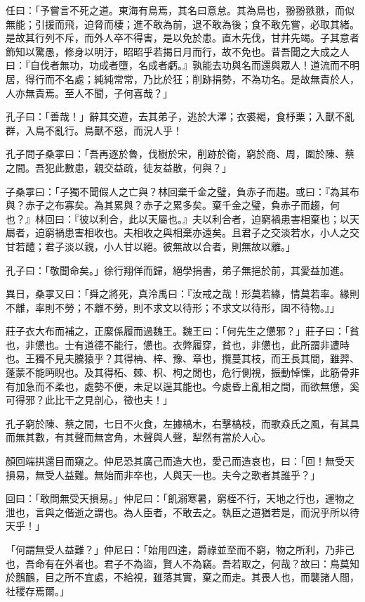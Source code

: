 \begin{pinyinscope}
任曰：「予嘗言不死之道。東海有鳥焉，其名曰意怠。其為鳥也，翂翂翐翐，而似無能；引援而飛，迫脅而棲；進不敢為前，退不敢為後；食不敢先嘗，必取其緒。是故其行列不斥，而外人卒不得害，是以免於患。直木先伐，甘井先竭。子其意者飾知以驚愚，修身以明汙，昭昭乎若揭日月而行，故不免也。昔吾聞之大成之人曰：『自伐者無功，功成者墮，名成者虧。』孰能去功與名而還與眾人！道流而不明居，得行而不名處；純純常常，乃比於狂；削跡捐勢，不為功名。是故無責於人，人亦無責焉。至人不聞，子何喜哉？」

孔子曰：「善哉！」辭其交遊，去其弟子，逃於大澤；衣裘褐，食杼栗；入獸不亂群，入鳥不亂行。鳥獸不惡，而況人乎！

孔子問子桑雽曰：「吾再逐於魯，伐樹於宋，削跡於衛，窮於商、周，圍於陳、蔡之間。吾犯此數患，親交益疏，徒友益散，何與？」

子桑雽曰：「子獨不聞假人之亡與？林回棄千金之璧，負赤子而趨。或曰：『為其布與？赤子之布寡矣。為其累與？赤子之累多矣。棄千金之璧，負赤子而趨，何也？』林回曰：『彼以利合，此以天屬也。』夫以利合者，迫窮禍患害相棄也；以天屬者，迫窮禍患害相收也。夫相收之與相棄亦遠矣。且君子之交淡若水，小人之交甘若醴；君子淡以親，小人甘以絕。彼無故以合者，則無故以離。」

孔子曰：「敬聞命矣。」徐行翔佯而歸，絕學捐書，弟子無挹於前，其愛益加進。

異日，桑雽又曰：「舜之將死，真泠禹曰：『汝戒之哉！形莫若緣，情莫若率。緣則不離，率則不勞；不離不勞，則不求文以待形；不求文以待形，固不待物。』」

莊子衣大布而補之，正緳係履而過魏王。魏王曰：「何先生之憊邪？」莊子曰：「貧也，非憊也。士有道德不能行，憊也。衣弊履穿，貧也，非憊也，此所謂非遭時也。王獨不見夫騰猿乎？其得柟、梓、豫、章也，攬蔓其枝，而王長其間，雖羿、蓬蒙不能眄睨也。及其得柘、棘、枳、枸之閒也，危行側視，振動悼慄，此筋骨非有加急而不柔也，處勢不便，未足以逞其能也。今處昏上亂相之間，而欲無憊，奚可得邪？此比干之見剖心，徵也夫！」

孔子窮於陳、蔡之間，七日不火食，左據槁木，右擊槁枝，而歌猋氏之風，有其具而無其數，有其聲而無宮角，木聲與人聲，犁然有當於人心。

顏回端拱還目而窺之。仲尼恐其廣己而造大也，愛己而造哀也，曰：「回！無受天損易，無受人益難。無始而非卒也，人與天一也。夫今之歌者其誰乎？」

回曰：「敢問無受天損易。」仲尼曰：「飢溺寒暑，窮桎不行，天地之行也，運物之泄也，言與之偕逝之謂也。為人臣者，不敢去之。執臣之道猶若是，而況乎所以待天乎！」

「何謂無受人益難？」仲尼曰：「始用四達，爵祿並至而不窮，物之所利，乃非己也，吾命有在外者也。君子不為盜，賢人不為竊。吾若取之，何哉？故曰：鳥莫知於鷾鴯，目之所不宜處，不給視，雖落其實，棄之而走。其畏人也，而襲諸人間，社稷存焉爾。」


\end{pinyinscope}
